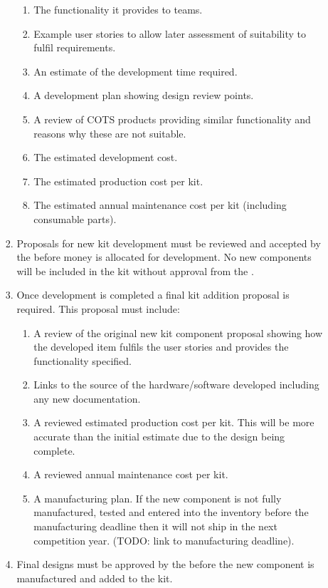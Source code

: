 \begin{enumerate}
\begin{enumerate}
\begin{enumerate}
\begin{enumerate}
            \item The functionality it provides to teams.
            \item Example user stories to allow later assessment of suitability to fulfil requirements.
            \item An estimate of the development time required.
            \item A development plan showing design review points.
            \item A review of COTS products providing similar functionality and reasons why these are not suitable.
            \item The estimated development cost.
            \item The estimated production cost per kit.
            \item The estimated annual maintenance cost per kit (including consumable parts).
          \end{enumerate}
        \item Proposals for new kit development must be reviewed and accepted by the  before money is allocated for development. No new components will be included in the kit without approval from the .
        \item Once development is completed a final kit addition proposal is required. This proposal must include:
          \begin{enumerate}
            \item A review of the original new kit component proposal showing how the developed item fulfils the user stories and provides the functionality specified.
            \item Links to the source of the hardware/software developed including any new documentation.
            \item A reviewed estimated production cost per kit. This will be more accurate than the initial estimate due to the design being complete.
            \item A reviewed annual maintenance cost per kit.
            \item A manufacturing plan. If the new component is not fully manufactured, tested and entered into the inventory before the manufacturing deadline then it will not ship in the next competition year. (TODO: link to manufacturing deadline).
          \end{enumerate}
        \item Final designs must be approved by the  before the new component is manufactured and added to the kit.

\end{enumerate}
\end{enumerate}
\end{enumerate}

